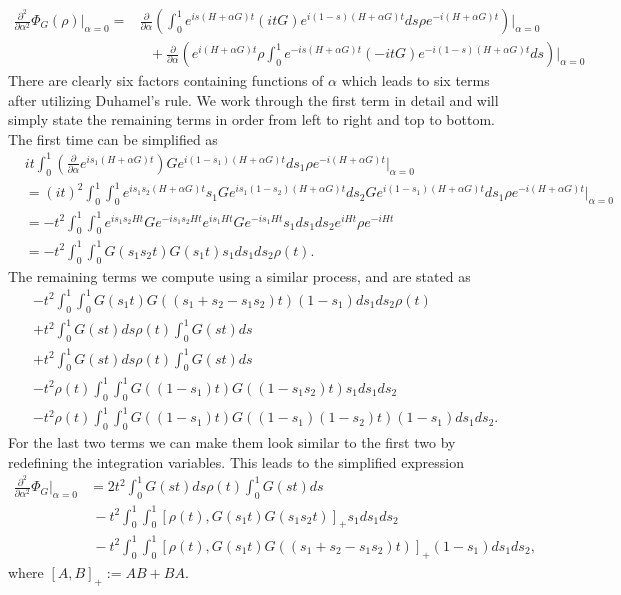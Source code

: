 \documentclass{article}
\newcommand{\parens}[1]{\left( #1 \right)}
\newcommand{\brackets}[1]{\left[ #1 \right]}
\begin{document}
\begin{align}
    \frac{\partial^2}{\partial \alpha^2} \Phi_G(\rho) \bigg|_{\alpha = 0} =& \frac{\partial}{\partial \alpha} \parens{\int_{0}^{1} e^{i s (H+\alpha G)t} (i t G) e^{i (1-s) (H+\alpha G)t} ds \rho e^{-i(H+\alpha G)t}} \bigg|_{\alpha=0} \nonumber \\
    &\text{ } +\frac{\partial}{\partial \alpha} \parens{ e^{i(H+\alpha G)t} \rho \int_{0}^1 e^{-i s (H+\alpha G) t} (- i t G) e^{-i (1-s) (H+\alpha G)t} ds } \bigg|_{\alpha = 0}
\end{align}
There are clearly six factors containing functions of $\alpha$ which leads to six terms after utilizing Duhamel's rule. We work through the first term in detail and will simply state the remaining terms in order from left to right and top to bottom. The first time can be simplified as
\begin{align}
    &i t\int_0^1 \parens{\frac{\partial}{\partial \alpha} e^{i s_1 (H+ \alpha G)t}} G e^{i(1-s_1)(H+\alpha G)t} ds_1 \rho e^{-i (H+\alpha G)t} \bigg|_{\alpha=0} \\
    &= (it)^2 \int_0^1 \int_0^1 e^{i s_1 s_2 (H+\alpha G)t} s_1 G e^{i s_1 (1-s_2) (H+\alpha G)t} ds_2 G e^{i(1-s_1) (H+\alpha G)t} ds_1 \rho e^{-i(H+\alpha G) t} \bigg|_{\alpha=0} \\
    &= -t^2 \int_0^1 \int_0^1 e^{i s_1 s_2 H t} G e^{-i s_1 s_2 H t} e^{i s_1 H t} G e^{-i s_1 H t} s_1 ds_1 ds_2 e^{i H t} \rho e^{-i H t} \\
    &= -t^2 \int_0^1 \int_0^1 G(s_1 s_2 t) G(s_1 t) s_1 ds_1 ds_2 \rho(t). 
\end{align}
The remaining terms we compute using a similar process, and are stated as
\begin{align}
    & -t^2 \int_0^1 \int_0^1 G(s_1 t) G((s_1 + s_2 - s_1 s_2) t) (1-s_1) ds_1 ds_2 \rho (t) \\
    & +t^2 \int_0^1 G(st) ds \rho(t) \int_0^1 G(st) ds \\
    & +t^2 \int_0^1 G(st) ds \rho(t) \int_0^1 G(st) ds \\
    & -t^2 \rho(t) \int_0^1 \int_0^1 G((1-s_1)t) G((1-s_1 s_2) t) s_1 ds_1 ds_2 \\
    & -t^2 \rho(t) \int_0^1 \int_0^1 G((1-s_1)t) G((1-s_1)(1 - s_2) t) (1-s_1) ds_1 ds_2.
\end{align}
For the last two terms we can make them look similar to the first two by redefining the integration variables. This leads to the simplified expression
\begin{align}
    \frac{\partial^2}{\partial \alpha^2} \Phi_G \bigg|_{\alpha = 0} &= 2 t^2 \int_0^1 G(st) ds \rho(t) \int_0^1 G(st) ds \label{eq:second_order_duhamel_one} \\
    &~ - t^2 \int_0^1 \int_0^1 \brackets{\rho(t) , G(s_1 t) G(s_1 s_2 t)}_+ s_1 ds_1 ds_2 \label{eq:second_order_duhamel_two}  \\
    &~ - t^2 \int_0^1 \int_0^1 \brackets{ \rho(t), G(s_1 t) G((s_1 + s_2 - s_1 s_2) t) }_+ (1-s_1) ds_1 ds_2, \label{eq:second_order_duhamel_three} 
\end{align}
where $[A,B]_+ := AB + BA$. 
\end{document}
